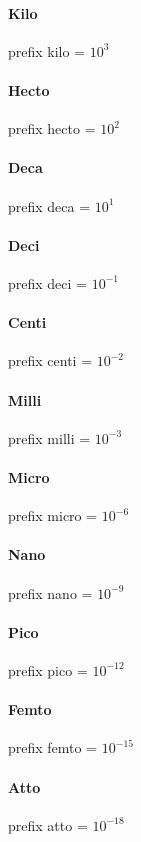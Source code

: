 \paragraph{Kilo}
prefix kilo = $10^3$


\paragraph{Hecto}
prefix hecto = $10^2$


\paragraph{Deca}
prefix deca = $10^1$


\paragraph{Deci}
prefix deci = $10^{-1}$


\paragraph{Centi}
prefix centi = $10^{-2}$


\paragraph{Milli}
prefix milli = $10^{-3}$


\paragraph{Micro}
prefix micro = $10^{-6}$


\paragraph{Nano}
prefix nano = $10^{-9}$


\paragraph{Pico}
prefix pico = $10^{-12}$


\paragraph{Femto}
prefix femto = $10^{-15}$


\paragraph{Atto}
prefix atto = $10^{-18}$



